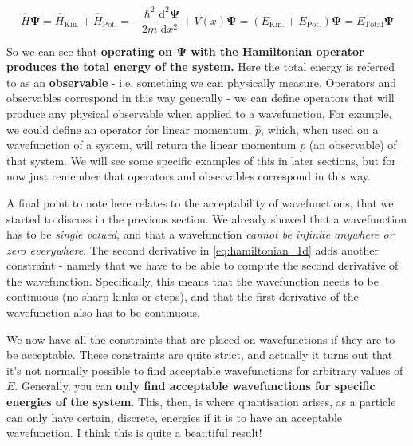 \documentclass{memoir}[11pt,oneside,a4paper,openany]
\newcommand{\wf}{\ensuremath{\bm{\Psi}}\xspace}
\begin{document}
\begin{equation}\label{eq:tise_1d}
	\hat{H}\wf = \hat{H}_{\text{Kin.}} + \hat{H}_{\text{Pot.}} = -\frac{\hbar^2}{2m} \frac{\mathrm{d}^2\wf}{\mathrm{d}x^2} + V(x)\wf = (E_{\text{Kin.}}+E_{\text{Pot.}})\wf = E_{\text{Total}} \wf
\end{equation}

So we can see that \textbf{operating on \wf with the Hamiltonian operator produces the total energy of the system.} Here the total energy is referred to as an \textbf{observable} - i.e. something we can physically measure. Operators and observables correspond in this way generally - we can define operators that will produce any physical observable when applied to a wavefunction. For example, we could define an operator for linear momentum, $\hat{p}$, which, when used on a wavefunction of a system, will return the linear momentum $p$ (an observable) of that system. We will see some specific examples of this in later sections, but for now just remember that operators and observables correspond in this way.  

A final point to note here relates to the acceptability of wavefunctions, that we started to discuss in the previous section. We already showed that a wavefunction has to be \emph{single valued}, and that a wavefunction \emph{cannot be infinite anywhere or zero everywhere}. The second derivative in \autoref{eq:hamiltonian_1d} adds another constraint - namely that we have to be able to compute the second derivative of the wavefunction. Specifically, this means that the wavefunction needs to be continuous (no sharp kinks or steps), and that the first derivative of the wavefunction also has to be continuous. 

We now have all the constraints that are placed on wavefunctions if they are to be acceptable. These constraints are quite strict, and actually it turns out that it's not normally possible to find acceptable wavefunctions for arbitrary values of $E$. Generally, you can \textbf{only find acceptable wavefunctions for specific energies of the system}. This, then, is where quantisation arises, as a particle can only have certain, discrete, energies if it is to have an acceptable wavefunction. I think this is quite a beautiful result!
\end{document}
